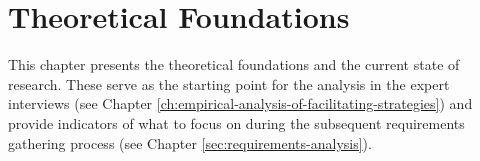 \chapter{Theoretical Foundations}
This chapter presents the theoretical foundations and the current state of research. These serve as the
starting point for the analysis in the expert interviews (see Chapter
\ref{ch:empirical-analysis-of-facilitating-strategies}) and
provide indicators of what to focus on during the subsequent requirements gathering process (see Chapter
\ref{sec:requirements-analysis}).





